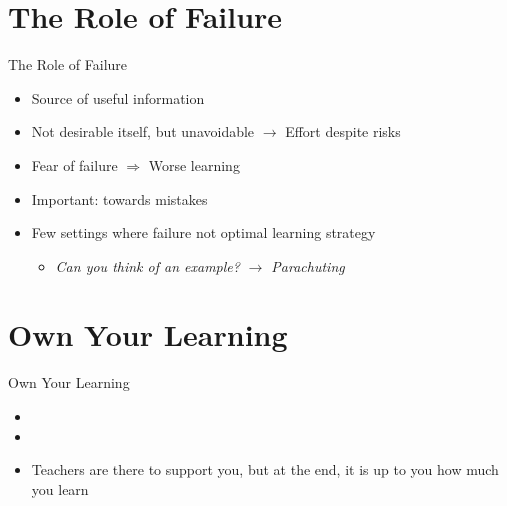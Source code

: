 \documentclass{ercisbeamer}
\begin{document}
\section{The Role of Failure}
\begin{frame}{The Role of Failure}
    \begin{itemize}
        \item Source of useful information
        \item Not desirable itself, but unavoidable $\rightarrow$ Effort despite risks
        \item Fear of failure $\Rightarrow$ Worse learning
        \item Important:  towards mistakes
        \item Few settings where failure not optimal learning strategy
        \begin{itemize}
            \item \emph{Can you think of an example?} \pause \emph{$\rightarrow$ Parachuting}
        \end{itemize}
    \end{itemize}
\end{frame}

\section{Own Your Learning}
\begin{frame}{Own Your Learning}
    \begin{tbox}
        \begin{itemize}
            \item {}
            \item {}
            \item Teachers are there to support you, but at the end, it is up to you how much you learn
        \end{itemize}
    \end{tbox}
\end{frame}

\end{document}

